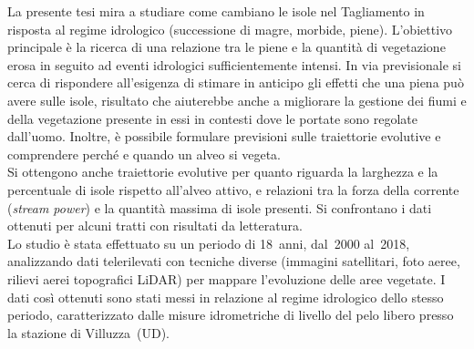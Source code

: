 La presente tesi mira a studiare come cambiano le isole nel Tagliamento in risposta al regime idrologico (successione di magre, morbide, piene).
L'obiettivo principale è la ricerca di una relazione tra le piene e la quantità di vegetazione erosa in seguito ad eventi idrologici sufficientemente intensi.
In via previsionale si cerca di rispondere all'esigenza di stimare in anticipo gli effetti che una piena può avere sulle isole, risultato che aiuterebbe anche a migliorare la gestione dei fiumi e della vegetazione presente in essi in contesti dove le portate sono regolate dall'uomo. 
Inoltre, è possibile formulare previsioni sulle traiettorie evolutive e comprendere perché e quando un alveo si vegeta.
\\
Si ottengono anche traiettorie evolutive per quanto riguarda la larghezza e la percentuale di isole rispetto all'alveo attivo, e relazioni tra la forza della corrente (\emph{stream power}) e la quantità massima di isole presenti.
Si confrontano i dati ottenuti per alcuni tratti con risultati da letteratura.
\\
Lo studio è stata effettuato su un periodo di 18~anni, dal~2000 al~2018, analizzando dati telerilevati con tecniche diverse (immagini satellitari, foto aeree, rilievi aerei topografici LiDAR) per mappare l'evoluzione delle aree vegetate.
I dati così ottenuti sono stati messi in relazione al regime idrologico dello stesso periodo, caratterizzato dalle misure idrometriche di livello del pelo libero presso la stazione di Villuzza~(UD). 

